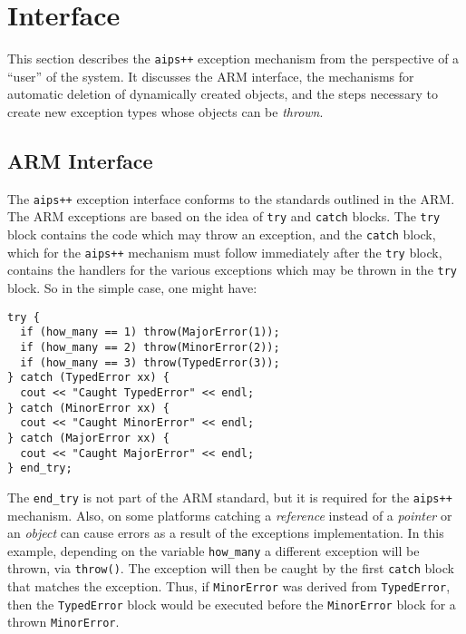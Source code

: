 \section{Interface}

This section describes the {\tt aips++} exception mechanism from the 
perspective of a ``user'' of the system. It discusses the ARM interface, the
mechanisms for automatic deletion of dynamically created objects, and the
steps necessary to create new exception types whose objects can be 
{\em thrown}.

\subsection{ARM Interface}

The {\tt aips++} exception interface conforms to the standards outlined in 
the ARM. The ARM exceptions are based on the idea of {\tt try} and 
{\tt catch} blocks. The {\tt try} block contains the code
which may throw an exception, and the {\tt catch} block, which for the
{\tt aips++} mechanism must follow immediately after the {\tt try} block,
contains the handlers for the various exceptions which may be thrown in the
{\tt try} block. So in the simple case, one might have:
\begin{verbatim}
try {
  if (how_many == 1) throw(MajorError(1));
  if (how_many == 2) throw(MinorError(2));
  if (how_many == 3) throw(TypedError(3));
} catch (TypedError xx) {
  cout << "Caught TypedError" << endl;
} catch (MinorError xx) {
  cout << "Caught MinorError" << endl;
} catch (MajorError xx) {
  cout << "Caught MajorError" << endl;
} end_try;
\end{verbatim}
\noindent
The {\tt end\_try} is not part of the ARM standard, but it is required for the
{\tt aips++} mechanism. Also, on some platforms catching a {\em reference} 
instead of a {\em pointer} or an {\em object} can cause errors as a result
of the exceptions implementation. In this example, depending on the variable 
{\tt how\_many} a different exception will be thrown, via {\tt throw()}.
The exception will then be caught by the first {\tt catch} block that
matches the exception. Thus, if {\tt MinorError} was derived from 
{\tt TypedError}, then the {\tt TypedError} block would be executed before 
the {\tt MinorError} block for a thrown {\tt MinorError}. 

